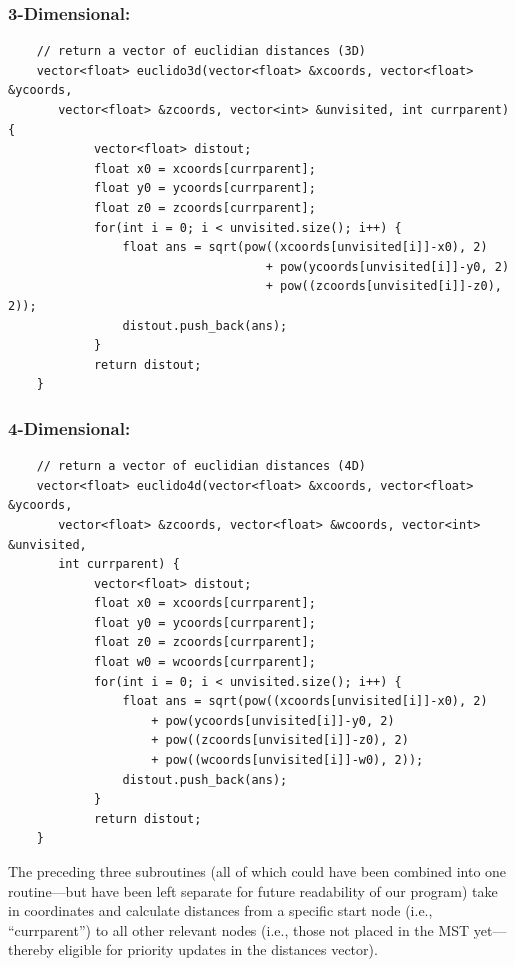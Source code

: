 \documentclass[conference]{styles/acmsiggraph}
\newcommand{\?}{\stackrel{?}{=}}
\begin{document}
\subsubsection{3-Dimensional:}
\begin{verbatim}
    // return a vector of euclidian distances (3D)
    vector<float> euclido3d(vector<float> &xcoords, vector<float> &ycoords,
       vector<float> &zcoords, vector<int> &unvisited, int currparent) {
            vector<float> distout;
            float x0 = xcoords[currparent];
            float y0 = ycoords[currparent];
            float z0 = zcoords[currparent];
            for(int i = 0; i < unvisited.size(); i++) {
                float ans = sqrt(pow((xcoords[unvisited[i]]-x0), 2) 
                                    + pow(ycoords[unvisited[i]]-y0, 2)
                                    + pow((zcoords[unvisited[i]]-z0), 2));
                distout.push_back(ans);
            }
            return distout;
    }
\end{verbatim}

\subsubsection{4-Dimensional:}
\begin{verbatim}
    // return a vector of euclidian distances (4D)
    vector<float> euclido4d(vector<float> &xcoords, vector<float> &ycoords,
       vector<float> &zcoords, vector<float> &wcoords, vector<int> &unvisited, 
       int currparent) {
            vector<float> distout;
            float x0 = xcoords[currparent];
            float y0 = ycoords[currparent];
            float z0 = zcoords[currparent];
            float w0 = wcoords[currparent];
            for(int i = 0; i < unvisited.size(); i++) {
                float ans = sqrt(pow((xcoords[unvisited[i]]-x0), 2) 
                    + pow(ycoords[unvisited[i]]-y0, 2)
                    + pow((zcoords[unvisited[i]]-z0), 2)
                    + pow((wcoords[unvisited[i]]-w0), 2));
                distout.push_back(ans);
            }
            return distout;
    }
\end{verbatim}
The preceding three subroutines (all of which could have been combined into one routine---but have been left separate for future readability of our program) take in coordinates and calculate distances from a specific start node (i.e., \enquote{currparent}) to all other relevant nodes (i.e., those not placed in the MST yet---thereby eligible for priority updates in the distances vector).
\end{document}
